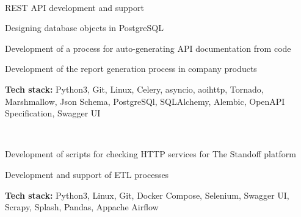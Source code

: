 \documentclass[a4paper]{MagicalCV}
\begin{document}
\hfill
\begin{minipage}[t]{0.66\textwidth} 


 \\
\vspace{\topsep} %
\begin{tightemize}
  \item REST API development and support
  \item Designing database objects in PostgreSQL
  \item Development of a process for auto-generating API documentation from code
  \item Development of the report generation process in company products
\end{tightemize}
\textbf{Tech stack:} Python3, Git, Linux, Celery, asyncio, aoihttp, Tornado, Marshmallow, Json Schema, PostgreSQl, SQLAlchemy, Alembic, OpenAPI Specification, Swagger UI
\sectionsep

 \\
\vspace{\topsep} %
\begin{tightemize}
  \item Development of scripts for checking HTTP services for The Standoff platform
  \item Development and support of ETL processes
\end{tightemize}
\textbf{Tech stack:} Python3, Linux, Git, Docker Compose, Selenium, Swagger UI, Scrapy, Splash, Pandas, Appache Airflow
\sectionsep


\end{minipage} 
\end{document}

